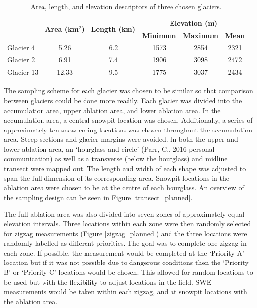\documentclass[12pt]{article}
\begin{document}
\begin{table}[b!]
\centering
\caption{Area, length, and elevation descriptors of three chosen glaciers.}
\label{glacierstats}
\begin{tabular}{|l|c|c|ccc|}
\hline
\multicolumn{1}{|c|}{} & \multirow{2}{*}{\textbf{Area (km$^2$)}} & \multirow{2}{*}{\textbf{Length (km)}} & \multicolumn{3}{c|}{\textbf{Elevation (m)}}         \\
\multicolumn{1}{|c|}{} &                                         &                                       & \textbf{Minimum} & \textbf{Maximum} & \textbf{Mean} \\ \hline
Glacier 4              & 5.26                                    & 6.2                                   & 1573             & 2854             & 2321          \\
Glacier 2              & 6.91                                    & 7.4                                   & 1906             & 3098             & 2472          \\
Glacier 13             & 12.33                                   & 9.5                                   & 1775             & 3037             & 2434          \\ \hline
\end{tabular}
\end{table} 

The sampling scheme for each glacier was chosen to be similar so that comparison between glaciers could be done more readily. Each glacier was divided into the accumulation area, upper ablation area, and lower ablation area. In the accumulation area, a central snowpit location was chosen. Additionally, a series of approximately ten snow coring locations was chosen throughout the accumulation area. Steep sections and glacier margins were avoided. In both the upper and lower ablation area, an `hourglass and circle' (Parr, C., 2016 personal communication) as well as a transverse (below the hourglass) and midline transect were mapped out. The length and width of each shape was adjusted to span the full dimension of its corresponding area. Snowpit locations in the ablation area were chosen to be at the centre of each hourglass. An overview of the sampling design can be seen in Figure \ref{transect_planned}.

The full ablation area was also divided into seven zones of approximately equal elevation intervals. Three locations within each zone were then randomly selected for zigzag \citep{Shea2010} measurements (Figure \ref{zigzag_planned}) and the three locations were randomly labelled as different priorities. The goal was to complete one zigzag in each zone. If possible, the measurement would be completed at the `Priority A' location but if it was not possible due to dangerous conditions then the `Priority B' or `Priority C' locations would be chosen. This allowed for random locations to be used but with the flexibility to adjust locations in the field. SWE measurements would be taken within each zigzag, and at snowpit locations with the ablation area.  
\end{document}
